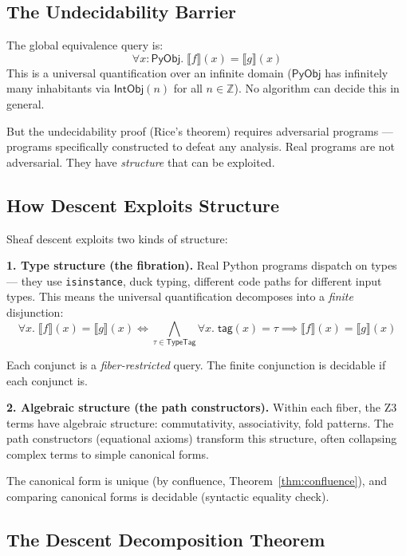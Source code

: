 \documentclass[11pt,a4paper]{report}
\theoremstyle{definition}
\theoremstyle{plain}
\newcommand{\den}[1]{\llbracket #1 \rrbracket}
\newcommand{\Int}{\mathbb{Z}}
\newcommand{\PyObj}{\mathsf{PyObj}}
\begin{document}
\subsection{The Undecidability Barrier}

The global equivalence query is:
\[
  \forall x : \PyObj.\; \den{f}(x) = \den{g}(x)
\]
This is a universal quantification over an infinite domain ($\PyObj$
has infinitely many inhabitants via $\mathsf{IntObj}(n)$ for all
$n \in \Int$).  No algorithm can decide this in general.

But the undecidability proof (Rice's theorem) requires adversarial
programs --- programs specifically constructed to defeat any analysis.
Real programs are not adversarial.  They have \emph{structure} that
can be exploited.

\subsection{How Descent Exploits Structure}

Sheaf descent exploits two kinds of structure:

\textbf{1. Type structure (the fibration).}
Real Python programs dispatch on types --- they use
\texttt{isinstance}, duck typing, different code paths for different
input types.  This means the universal quantification decomposes
into a \emph{finite} disjunction:
\[
  \forall x.\; \den{f}(x) = \den{g}(x)
  \iff
  \bigwedge_{\tau \in \mathsf{TypeTag}} \forall x.\;
    \mathsf{tag}(x) = \tau \implies \den{f}(x) = \den{g}(x)
\]

Each conjunct is a \emph{fiber-restricted} query.  The finite
conjunction is decidable if each conjunct is.

\textbf{2. Algebraic structure (the path constructors).}
Within each fiber, the Z3 terms have algebraic structure:
commutativity, associativity, fold patterns.  The path constructors
(equational axioms) transform this structure, often collapsing
complex terms to simple canonical forms.

The canonical form is unique (by confluence, Theorem~\ref{thm:confluence}),
and comparing canonical forms is decidable (syntactic equality check).

\subsection{The Descent Decomposition Theorem}
\end{document}
